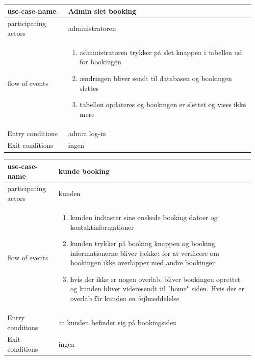 \documentclass[12pt,a4paper]{article}
\begin{document}
\bigskip

\begin{minipage}{\textwidth}

 \label{tab:title}
\begin{tabular}{| p{5cm} p{10cm} |}
\hline use-case-name & Admin slet booking \\
\hline participating actors & administratoren \\
\hline flow of events & \begin{enumerate}
\item administratoren trykker på slet knappen i tabellen ud for bookingen 
\item ændringen bliver sendt til databasen og bookingen slettes
\item tabellen opdateres og bookingen er slettet og vises ikke mere
\end{enumerate} \\
\hline Entry conditions & admin log-in \\
\hline Exit conditions & ingen \\
\hline
\end{tabular}

\end{minipage}
	
\bigskip

\begin{minipage}{\textwidth}

 \label{tab:title}
\begin{tabular}{| p{5cm} p{10cm} |}
\hline use-case-name & kunde booking \\
\hline participating actors & kunden \\
\hline flow of events & \begin{enumerate}
\item kunden indtaster sine ønskede booking datoer og kontaktinformationer 
\item kunden trykker på booking knappen og booking informationerne bliver tjekket for at verificere om bookingen ikke overlapper med andre bookinger
\item hvis der ikke er nogen overlab, bliver bookingen oprettet og kunden bliver videresendt til "home" siden. Hvis der er overlab får kunden en fejlmeddelelse
\end{enumerate} \\
\hline Entry conditions & at kunden befinder sig på bookingsiden \\
\hline Exit conditions & ingen \\
\hline
\end{tabular}

\end{minipage}	
	
\end{document}
